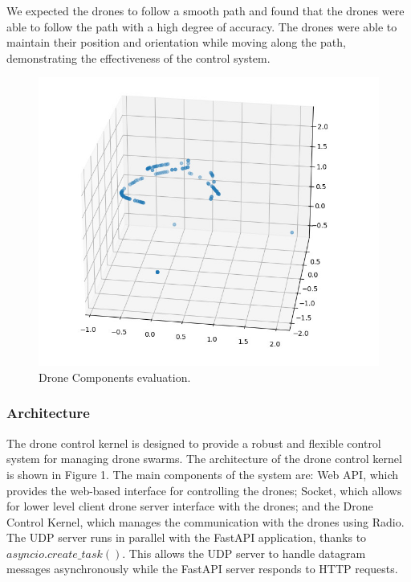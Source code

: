 We expected the drones to follow a smooth path and found that the drones were able to follow the path with a high degree of accuracy. The drones were able to maintain their position and orientation while moving along the path, demonstrating the effectiveness of the control system. 
\begin{figure}[htbp]
    \centerline{\includegraphics{images/pos.jpg}}
    \caption{Drone Components evaluation.}
    \label{fig}
    \end{figure}


\subsubsection{Architecture}
The drone control kernel is designed to provide a robust and flexible control system for managing drone swarms. The architecture of the drone control kernel is shown in Figure 1. The main components of the system are: 
Web \gls{API}, which provides the web-based interface for controlling the drones; 
Socket, which allows for lower level client drone server interface with the drones; and the Drone Control Kernel, which manages the communication with the drones using Radio. 
The UDP server runs in parallel with the Fast\gls{API} application, thanks to $asyncio.create\_task()$. \cite{asyncio} This allows the UDP server to handle datagram messages asynchronously while the FastAPI server responds to HTTP requests.

